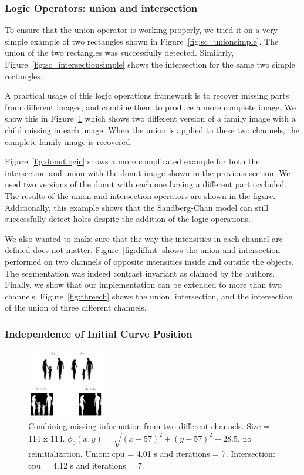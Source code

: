 \documentclass[10pt,twocolumn,letterpaper]{article}
\begin{document}
\subsubsection*{Logic Operators: union and intersection}

To ensure that the union operator is working properly, we tried it on a very simple example of two rectangles shown in Figure~\ref{fig:sc_unionsimple}. The
union of the two rectangles was successfully detected. Similarly, Figure~\ref{fig:sc_intersectionsimple} shows the intersection for the same two simple
rectangles. 

A practical usage of this logic operations framework is to recover missing parts from different images, and combine them to produce a more complete image. We
show this in Figure~\ref{fig:family} which shows two different version of a family image with a child missing in each image. When the union is applied to these
two channels, the complete family image is recovered.


Figure~\ref{fig:donutlogic} shows a more complicated example for both the intersection and union with the donut image shown in the previous section. We used
two versions of the donut with each one having a different part occluded. The results of the union and intersection operators are shown in the figure.
Additionally, this example shows that the Sandberg-Chan model can still successfully detect holes despite the addition of the logic operations.

We also wanted to make sure that the way the intensities in each channel are defined does not
matter. Figure~\ref{fig:diffint} shows the union and intersection performed on two channels of opposite intensities inside and outside the objects. The
segmentation was indeed contrast invariant as claimed by the authors. Finally, we show that our implementation can be extended to more than two channels.
Figure~\ref{fig:threech} shows the union, intersection, and the intersection of the union of three different channels.


\subsubsection*{Independence of Initial Curve Position}

\begin{figure}[h!]
\centering
\includegraphics[width=0.3\textwidth]{family.png}
\caption{Combining missing information from two different channels. Size = 114 x 114. $\phi_{0}(x,y) = \sqrt{(x - 57)^2 + (y - 57)^2} -
28.5$, no reinitialization. Union: cpu = 4.01 s and iterations = 7. Intersection: cpu = 4.12 s and iterations = 7.}
\label{fig:family}
\end{figure}
\end{document}
